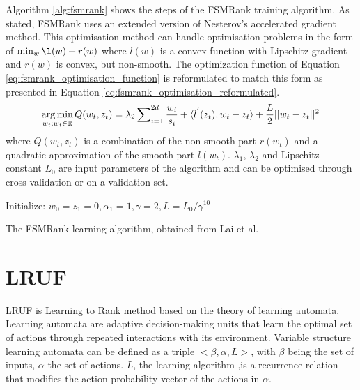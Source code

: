 Algorithm \ref{alg:fsmrank} shows the steps of the FSMRank training algorithm. As stated, FSMRank uses an  extended version of Nesterov's accelerated gradient method. This optimisation method can handle optimisation problems in the form of $\min_w \l(w) + r(w)$ where $l(w)$ is a convex function with Lipschitz gradient and $r(w)$ is convex, but non-smooth. The optimization function of Equation \ref{eq:fsmrank_optimisation_function} is reformulated to match this form as presented in Equation \ref{eq:fsmrank_optimisation_reformulated}.
\begin{equation}
\operatorname*{arg\,min}_{w_t:w_t\in \mathbb{R}} Q(w_t,z_t) = \lambda_2 \sum\nolimits_{i=1}^{2d}\frac{w_i}{s_i}+\langle l^{'}(z_t),w_t-z_t \rangle+\frac{L}{2}||w_t-z_t||^2
\label{eq:fsmrank_optimisation_reformulated}
\end{equation}
\noindent where $Q(w_t,z_t)$ is a combination of the non-smooth part $r(w_t)$ and a quadratic approximation of the smooth part $l(w_t)$. $\lambda_1$, $\lambda_2$ and Lipschitz constant $L_0$ are input parameters of the algorithm and can be optimised through cross-validation or on a validation set.\\

\LinesNumbered
\begin{algorithm}[H]
 Initialize: $w_0=z_1=0, \alpha_1=1, \gamma=2, L=L_0/\gamma^{10}$\\
 
 \caption{The FSMRank learning algorithm, obtained from Lai et al. \cite{Lai2013c}}
 \label{alg:fsmrank}
\end{algorithm}

\section{LRUF}
LRUF \cite{Torkestani2012b} is Learning to Rank method based on the theory of learning automata. Learning automata are adaptive decision-making units that learn the optimal set of actions through repeated interactions with its environment. Variable structure learning automata can be defined as a triple $<\beta,\alpha,L>$, with $\beta$ being the set of inputs, $\alpha$ the set of actions. $L$, the learning algorithm ,is a recurrence relation that modifies the action probability vector of the actions in $\alpha$.\\

